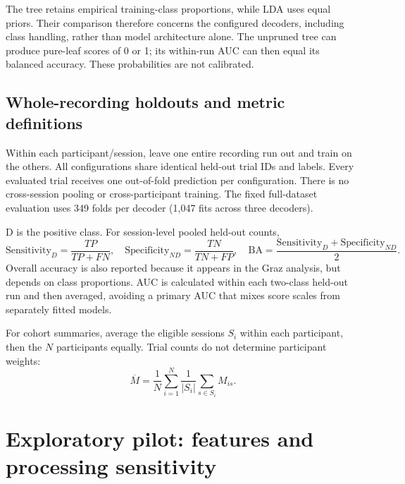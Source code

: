 \documentclass[11pt,a4paper]{article}
\begin{document}
The tree retains empirical training-class proportions, while LDA uses equal priors. Their comparison therefore concerns the configured decoders, including class handling, rather than model architecture alone. The unpruned tree can produce pure-leaf scores of 0 or 1; its within-run AUC can then equal its balanced accuracy. These probabilities are not calibrated.

\subsection{Whole-recording holdouts and metric definitions}
Within each participant/session, leave one entire recording run out and train on the others. All configurations share identical held-out trial IDs and labels. Every evaluated trial receives one out-of-fold prediction per configuration. There is no cross-session pooling or cross-participant training. The fixed full-dataset evaluation uses 349 folds per decoder (1,047 fits across three decoders).

D is the positive class. For session-level pooled held-out counts,
\[
\mathrm{Sensitivity}_D=\frac{TP}{TP+FN},\quad
\mathrm{Specificity}_{ND}=\frac{TN}{TN+FP},\quad
\mathrm{BA}=\frac{\mathrm{Sensitivity}_D+\mathrm{Specificity}_{ND}}{2}.
\]
Overall accuracy is also reported because it appears in the Graz analysis, but depends on class proportions. AUC is calculated within each two-class held-out run and then averaged, avoiding a primary AUC that mixes score scales from separately fitted models.

For cohort summaries, average the eligible sessions $S_i$ within each participant, then the $N$ participants equally. Trial counts do not determine participant weights:
\[
\overline M=\frac{1}{N}\sum_{i=1}^{N}\frac{1}{|S_i|}\sum_{s\in S_i} M_{is}.
\]


\clearpage
\section{Exploratory pilot: features and processing sensitivity}
\end{document}
